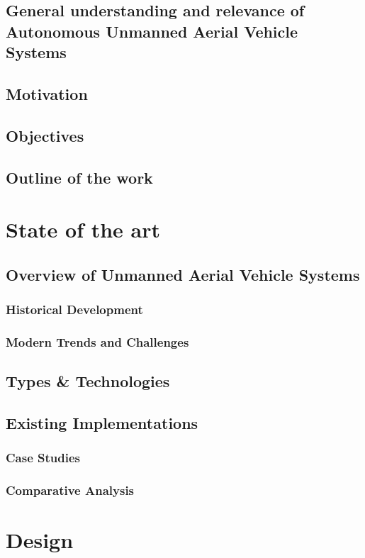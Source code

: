 \documentclass[oneside, 12pt, a4paper]{book}
\begin{document}
\mainmatter%

\chapter{General understanding and relevance of Autonomous Unmanned Aerial Vehicle Systems}
\chapter{Motivation}
\chapter{Objectives}
\chapter{Outline of the work}
\part{State of the art}
\chapter{Overview of Unmanned Aerial Vehicle Systems}

\section{Historical Development}
\section{Modern Trends and Challenges}
\chapter{Types \& Technologies}
\chapter{Existing Implementations}
\section{Case Studies}
\section{Comparative Analysis}
\part{Design}
\end{document}
